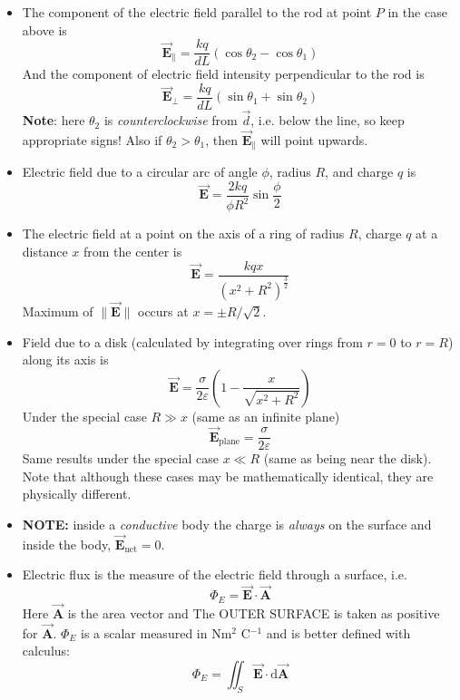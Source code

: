 \documentclass{scrartcl}
\begin{document}
    \begin{itemize}
        \item The component of the electric field parallel to the rod at point $P$ in the case above is \[\boxed{\vec{\mathbf E}_{\parallel}=\frac{kq}{dL}\left(\cos\theta_2-\cos\theta_1\right)}\] And the component of electric field intensity perpendicular to the rod is \[\boxed{\vec{\mathbf E}_{\perp}=\frac{kq}{dL}\left(\sin\theta_1+\sin\theta_2\right)}\] \textbf{Note}: here $\theta_2$  is \textit{counterclockwise} from $\vec d$, i.e. below the line, so keep appropriate signs! Also if $\theta_2>\theta_1$, then $\vec{\mathbf E}_{\parallel}$ will point upwards.
        \item Electric field due to a circular arc of angle $\phi$, radius $R$, and charge $q$ is \[\boxed{\vec{\mathbf E}=\frac{2kq}{\phi R^2}\sin\frac{\phi}2}\]
        \item The electric field at a point on the axis of a ring of radius $R$, charge $q$ at a distance $x$ from the center is \[\boxed{\vec{\mathbf E}=\frac{kqx}{\left(x^2+R^2\right)^\frac32}}\] Maximum of $\|\vec{\mathbf E}\|$ occurs at $x=\pm R/{\sqrt2}$.
        \item Field due to a disk (calculated by integrating over rings from $r=0$ to $r=R$) along its axis is \[\vec{\mathbf E}=\frac{\sigma}{2\varepsilon}\left(1-\frac x{\sqrt{x^2+R^2}}\right)\] Under the special case $R\gg x$ (same as an infinite plane) \[\boxed{\vec{\mathbf E}_\text{plane}=\frac\sigma{2\varepsilon}}\] Same results under the special case $x\ll R$ (same as being near the disk). Note that although these cases may be mathematically identical, they are physically different.
        \item \textbf{NOTE:} inside a \textit{conductive} body the charge is \textit{always} on the surface and inside the body, $\boxed{\vec{\mathbf E}_\text{net}=0}$.
        \item Electric flux is the measure of the electric field through a surface, i.e. \[\boxed{\Phi_E=\vec{\mathbf E}\cdot\vec{\mathbf A}}\] Here $\vec{\mathbf A}$ is the area vector and The OUTER SURFACE is taken as positive for $\vec{\mathbf A}$. $\Phi_E$ is a scalar measured in Nm$^2$ C$^{-1}$ and is better defined with calculus: \[\boxed{\Phi_E=\iint_S\vec{\mathbf E}\cdot\mathrm d\vec{\mathbf A}}\]

\end{itemize}
\end{document}
